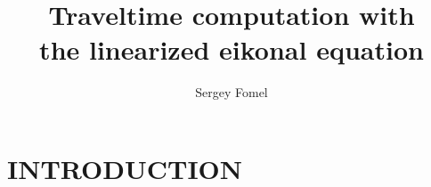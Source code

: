 {}
\title{Traveltime computation with \\ the linearized eikonal equation}

\author{Sergey Fomel}

\maketitle

\section{INTRODUCTION}

